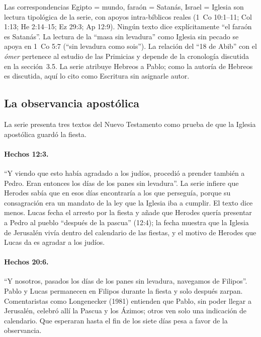 \documentclass[11pt,letterpaper]{article}
\begin{document}
\begin{nota}[Precisión]
Las correspondencias Egipto = mundo, faraón = Satanás, Israel = Iglesia son lectura tipológica de la serie, con apoyos intra-bíblicos reales (1~Co 10:1--11; Col 1:13; He 2:14--15; Ez 29:3; Ap 12:9). Ningún texto dice explícitamente ``el faraón es Satanás''. La lectura de la ``masa sin levadura'' como Iglesia sin pecado se apoya en 1~Co 5:7 (``sin levadura como sois''). La relación del ``18 de Abib'' con el \emph{ómer} pertenece al estudio de las Primicias y depende de la cronología discutida en la sección~3.5. La serie atribuye Hebreos a Pablo; como la autoría de Hebreos es discutida, aquí lo cito como Escritura sin asignarle autor.
\end{nota}

\subsection{La observancia apostólica}
La serie presenta tres textos del Nuevo Testamento como prueba de que la Iglesia apostólica guardó la fiesta.

\paragraph{Hechos 12:3.} ``Y viendo que esto había agradado a los judíos, procedió a prender también a Pedro. Eran entonces los días de los panes sin levadura''. La serie infiere que Herodes sabía que en esos días encontraría a los que perseguía, porque su consagración era un mandato de la ley que la Iglesia iba a cumplir. El texto dice menos. Lucas fecha el arresto por la fiesta y añade que Herodes quería presentar a Pedro al pueblo ``después de la pascua'' (12:4); la fecha muestra que la Iglesia de Jerusalén vivía dentro del calendario de las fiestas, y el motivo de Herodes que Lucas da es agradar a los judíos.

\paragraph{Hechos 20:6.} ``Y nosotros, pasados los días de los panes sin levadura, navegamos de Filipos''. Pablo y Lucas permanecen en Filipos durante la fiesta y solo después zarpan. Comentaristas como Longenecker (1981) entienden que Pablo, sin poder llegar a Jerusalén, celebró allí la Pascua y los Ázimos; otros ven solo una indicación de calendario. Que esperaran hasta el fin de los siete días pesa a favor de la observancia.
\end{document}
